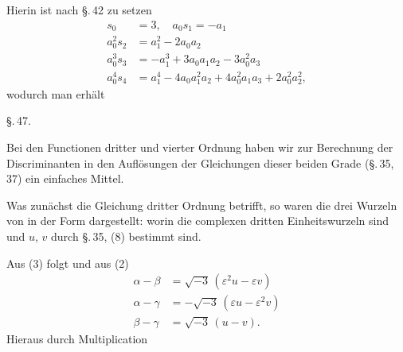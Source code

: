 
Hierin ist nach \S.\,42 zu setzen
\[
\begin{aligned}
s_0 &= 3, \quad a_0 s_1 = -a_1\\
a_0^2 s_2 &= a_1^2 - 2 a_0 a_2\\
a_0^3 s_3 &= -a_1^3 + 3 a_0 a_1 a_2 - 3 a_0^2 a_3\\
a_0^4 s_4 &= a_1^4 - 4 a_0 a_1^2 a_2 + 4 a_0^2 a_1 a_3 + 2 a_0^2 a_2^2,
\end{aligned}
\]
wodurch man erhält


\begin{center}
\S.\,47.

\end{center}

Bei den Functionen dritter und vierter Ordnung haben wir zur Berechnung der Discriminanten in den Auflösungen der Gleichungen dieser beiden Grade (\S.\,35, 37) ein einfaches Mittel.

Was zunächst die Gleichung dritter Ordnung betrifft, so waren die drei Wurzeln von
in der Form dargestellt:
worin
die complexen dritten Einheitswurzeln sind und $u$, $v$ durch \S.\,35, (8) bestimmt sind.

Aus (3) folgt
und aus (2)
\[
\begin{aligned}
\alpha - \beta &= \sqrt{-3}\,(\varepsilon^2 u - \varepsilon v)\\
\alpha - \gamma &= -\sqrt{-3}\,(\varepsilon u - \varepsilon^2 v)\\
\beta - \gamma &= \sqrt{-3}\,(u - v).
\end{aligned}
\]
Hieraus durch Multiplication
